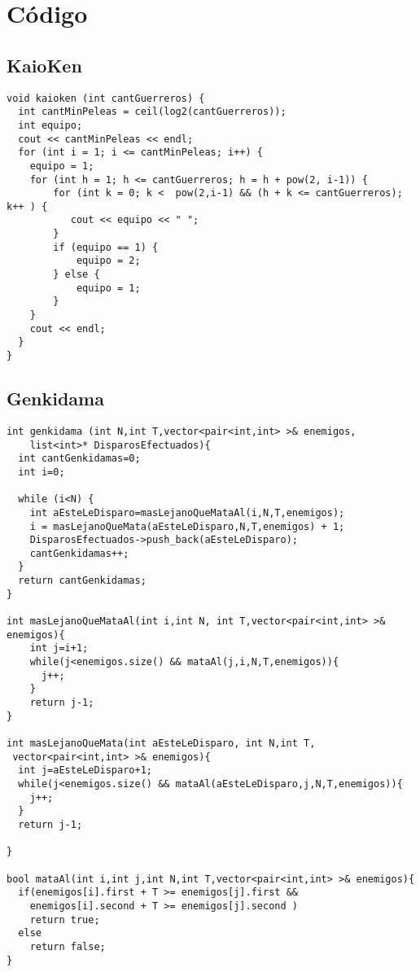 
\section{Código}
\subsection{KaioKen}

\begin{lstlisting}
void kaioken (int cantGuerreros) {
  int cantMinPeleas = ceil(log2(cantGuerreros));
  int equipo;
  cout << cantMinPeleas << endl;
  for (int i = 1; i <= cantMinPeleas; i++) { 
    equipo = 1; 
    for (int h = 1; h <= cantGuerreros; h = h + pow(2, i-1)) {
        for (int k = 0; k <  pow(2,i-1) && (h + k <= cantGuerreros); k++ ) {
           cout << equipo << " ";
        }
        if (equipo == 1) {
            equipo = 2;
        } else {
            equipo = 1;
        }
    }
    cout << endl;
  }
}
\end{lstlisting}

\subsection{Genkidama}

\begin{lstlisting}
int genkidama (int N,int T,vector<pair<int,int> >& enemigos,
	list<int>* DisparosEfectuados){
  int cantGenkidamas=0;
  int i=0;

  while (i<N) {
    int aEsteLeDisparo=masLejanoQueMataAl(i,N,T,enemigos);
    i = masLejanoQueMata(aEsteLeDisparo,N,T,enemigos) + 1;
    DisparosEfectuados->push_back(aEsteLeDisparo);
    cantGenkidamas++;
  }
  return cantGenkidamas;
}

int masLejanoQueMataAl(int i,int N, int T,vector<pair<int,int> >& enemigos){
    int j=i+1;
    while(j<enemigos.size() && mataAl(j,i,N,T,enemigos)){
      j++;
    }
    return j-1;
}

int masLejanoQueMata(int aEsteLeDisparo, int N,int T,
 vector<pair<int,int> >& enemigos){
  int j=aEsteLeDisparo+1;
  while(j<enemigos.size() && mataAl(aEsteLeDisparo,j,N,T,enemigos)){
    j++;
  }
  return j-1;

}

bool mataAl(int i,int j,int N,int T,vector<pair<int,int> >& enemigos){
  if(enemigos[i].first + T >= enemigos[j].first && 
  	enemigos[i].second + T >= enemigos[j].second )
    return true;
  else
    return false;
}
\end{lstlisting}

